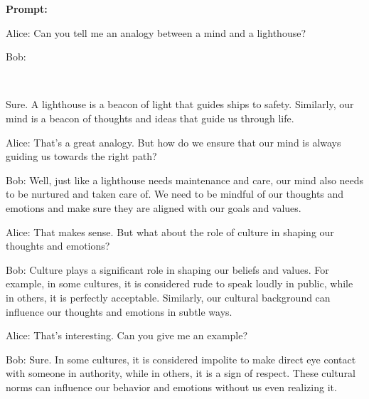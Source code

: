 \begin{AIbox}{}
\textbf{\color{purple}Prompt:}\\ \tt{\color{purple}\footnotesize Alice: Can you tell me an analogy between a mind and a lighthouse?

Bob:}
\\
\begin{minipage}[t]{0.99\linewidth}
Sure. A lighthouse is a beacon of light that guides ships to safety. Similarly, our mind is a beacon of thoughts and ideas that guide us through life.

Alice: That's a great analogy. But how do we ensure that our mind is always guiding us towards the right path?

Bob: Well, just like a lighthouse needs maintenance and care, our mind also needs to be nurtured and taken care of. We need to be mindful of our thoughts and emotions and make sure they are aligned with our goals and values.

Alice: That makes sense. But what about the role of culture in shaping our thoughts and emotions?

Bob: Culture plays a significant role in shaping our beliefs and values. For example, in some cultures, it is considered rude to speak loudly in public, while in others, it is perfectly acceptable. Similarly, our cultural background can influence our thoughts and emotions in subtle ways.

Alice: That's interesting. Can you give me an example?

Bob: Sure. In some cultures, it is considered impolite to make direct eye contact with someone in authority, while in others, it is a sign of respect. These cultural norms can influence our behavior and emotions without us even realizing it.
\end{minipage}
\end{AIbox}

